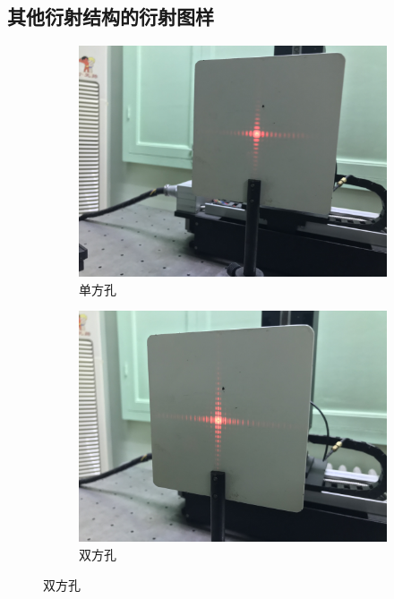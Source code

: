 \documentclass{article}
\begin{document}
    \subsection{其他衍射结构的衍射图样}    
    \begin{figure}
        \centering
        \begin{subfigure}[b]{0.45\textwidth}
            \includegraphics[width=\textwidth]{danfangkong.jpg}
            \caption{单方孔}
        \end{subfigure}  
        \begin{subfigure}[b]{0.45\textwidth}
            \includegraphics[width=\textwidth]{shuangfangkong.jpg}
            \caption{双方孔}
        \end{subfigure}
        

\end{figure}
\end{document}
